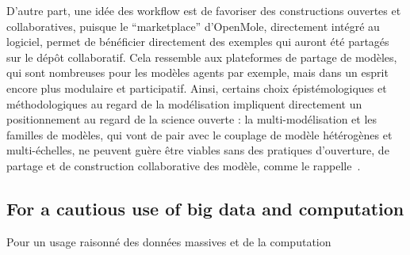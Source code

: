 \bpar{}
{
D'autre part, une idée des workflow est de favoriser des constructions ouvertes et collaboratives, puisque le ``marketplace'' d'OpenMole, directement intégré au logiciel, permet de bénéficier directement des exemples qui auront été partagés sur le dépôt collaboratif. Cela ressemble aux plateformes de partage de modèles, qui sont nombreuses pour les modèles agents par exemple, mais dans un esprit encore plus modulaire et participatif. Ainsi, certains choix épistémologiques et méthodologiques au regard de la modélisation impliquent directement un positionnement au regard de la science ouverte : la multi-modélisation et les familles de modèles, qui vont de pair avec le couplage de modèle hétérogènes et multi-échelles, ne peuvent guère être viables sans des pratiques d'ouverture, de partage et de construction collaborative des modèle, comme le rappelle~\cite{banos2013pour}.
}











\subsection{For a cautious use of big data and computation}{Pour un usage raisonné des données massives et de la computation}

